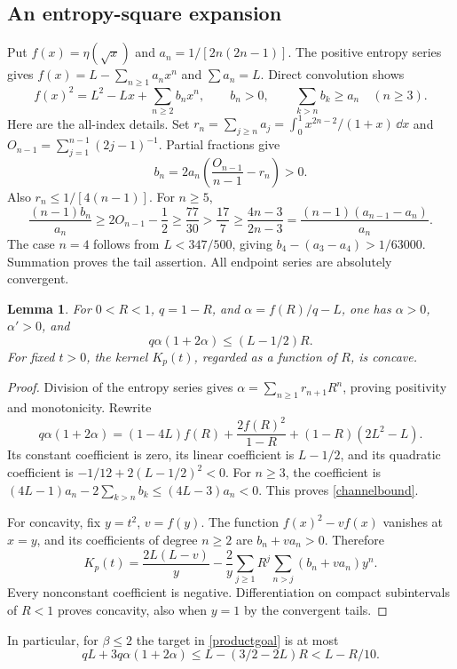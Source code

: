\documentclass[11pt]{article}
\newtheorem{lemma}[theorem]{Lemma}
\numberwithin{equation}{section}
\begin{document}
\subsection{An entropy-square expansion}
Put $f(x)=\eta(\sqrt x)$ and $a_n=1/[2n(2n-1)]$. The positive entropy series gives $f(x)=L-\sum_{n\ge1}a_nx^n$ and $\sum a_n=L$. Direct convolution shows
\begin{equation}\label{squaretails}
 f(x)^2=L^2-Lx+\sum_{n\ge2}b_nx^n,\qquad b_n>0,\qquad
 \sum_{k>n}b_k\ge a_n\quad(n\ge3).
\end{equation}
Here are the all-index details. Set $r_n=\sum_{j\ge n}a_j=\int_0^1x^{2n-2}/(1+x)\,\dd x$ and $O_{n-1}=\sum_{j=1}^{n-1}(2j-1)^{-1}$. Partial fractions give
\[
 b_n=2a_n\left(\frac{O_{n-1}}{n-1}-r_n\right)>0.
\]
Also $r_n\le1/[4(n-1)]$. For $n\ge5$,
\[
 \frac{(n-1)b_n}{a_n}\ge2O_{n-1}-\frac12
 \ge\frac{77}{30}>\frac{17}{7}
 \ge\frac{4n-3}{2n-3}
 =\frac{(n-1)(a_{n-1}-a_n)}{a_n}.
\]
The case $n=4$ follows from $L<347/500$, giving $b_4-(a_3-a_4)>1/63000$. Summation proves the tail assertion. All endpoint series are absolutely convergent.

\begin{lemma}\label{channel}
For $0<R<1$, $q=1-R$, and $\alpha=f(R)/q-L$, one has $\alpha>0$, $\alpha' >0$, and
\begin{equation}\label{channelbound}
 q\alpha(1+2\alpha)\le(L-1/2)R.
\end{equation}
For fixed $t>0$, the kernel $K_p(t)$, regarded as a function of $R$, is concave.
\end{lemma}
\begin{proof}
Division of the entropy series gives $\alpha=\sum_{n\ge1}r_{n+1}R^n$, proving positivity and monotonicity. Rewrite
\[
 q\alpha(1+2\alpha)=(1-4L)f(R)+\frac{2f(R)^2}{1-R}+(1-R)(2L^2-L).
\]
Its constant coefficient is zero, its linear coefficient is $L-1/2$, and its quadratic coefficient is $-1/12+2(L-1/2)^2<0$. For $n\ge3$, the coefficient is $(4L-1)a_n-2\sum_{k>n}b_k\le(4L-3)a_n<0$. This proves \eqref{channelbound}.

For concavity, fix $y=t^2$, $v=f(y)$. The function $f(x)^2-vf(x)$ vanishes at $x=y$, and its coefficients of degree $n\ge2$ are $b_n+va_n>0$. Therefore
\[
 K_p(t)=\frac{2L(L-v)}y
 -\frac2y\sum_{j\ge1}R^j\sum_{n>j}(b_n+va_n)y^n.
\]
Every nonconstant coefficient is negative. Differentiation on compact subintervals of $R<1$ proves concavity, also when $y=1$ by the convergent tails.
\end{proof}
In particular, for $\beta\le2$ the target in \eqref{productgoal} is at most
\begin{equation}\label{targetcap}
 qL+3q\alpha(1+2\alpha)
 \le L-(3/2-2L)R<L-R/10.
\end{equation}
\end{document}
